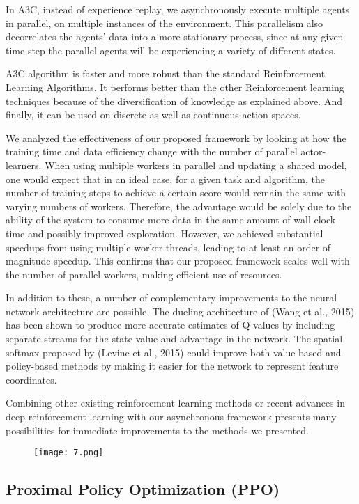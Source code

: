 \documentclass[conference]{IEEEtran}
\begin{document}
In A3C, instead of experience replay, we asynchronously execute multiple agents in parallel, on multiple instances of the environment. This parallelism also decorrelates the agents’ data into a more stationary process, since at any given time-step the parallel agents will be experiencing a variety of different states.

A3C algorithm is faster and more robust than the standard Reinforcement Learning Algorithms. It performs better than the other Reinforcement learning techniques because of the diversification of knowledge as explained above. And finally, it can be used on discrete as well as continuous action spaces.

We analyzed the effectiveness of our proposed framework by looking at how the training time and data efficiency change with the number of parallel actor-learners. When using multiple workers in parallel and updating a shared model, one would expect that in an ideal case, for a given task and algorithm, the number of training steps to achieve a certain score would remain the same with varying numbers of workers. Therefore, the advantage would be solely due to the ability of the system to consume more data in the same amount of wall clock time and possibly improved exploration. However, we achieved substantial speedups from using multiple worker threads, leading to at least an order of magnitude speedup. This confirms that our proposed framework scales well with the number of parallel workers, making efficient use of resources.

In addition to these, a number of complementary improvements to the neural network architecture are possible. The dueling architecture of (Wang et al., 2015) has been shown to produce more accurate estimates of Q-values by including separate streams for the state value and advantage in the network. The spatial softmax proposed by (Levine et al., 2015) could improve both value-based and policy-based methods by making it easier for the network to represent feature coordinates.

Combining other existing reinforcement learning methods or recent advances in deep reinforcement learning
with our asynchronous framework presents many possibilities for immediate improvements to the methods we presented.

\begin{figure}[htp]
    \centering
    \texttt{[image: 7.png]}
\end{figure}

\subsection{\textbf{Proximal Policy Optimization (PPO)}}
\end{document}
